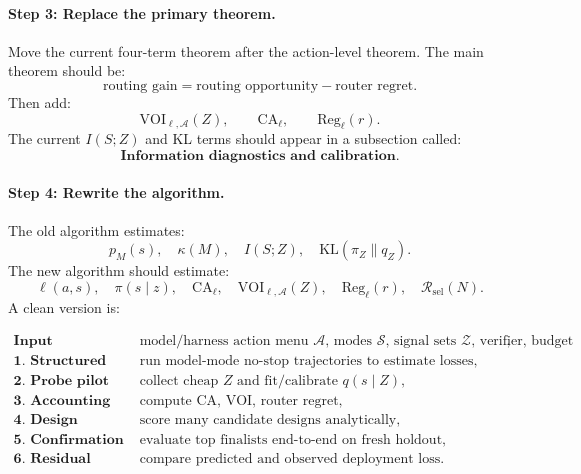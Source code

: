 \documentclass{article}
\newcommand{\KL}{\mathrm{KL}}
\begin{document}
\paragraph{Step 3: Replace the primary theorem.}
Move the current four-term theorem after the action-level theorem.
The main theorem should be:
\[
    \text{routing gain}=\text{routing opportunity}-\text{router regret}.
\]
Then add:
\[
    \mathrm{VOI}_{\ell,\mathcal A}(Z),
    \qquad
    \mathrm{CA}_\ell,
    \qquad
    \mathrm{Reg}_\ell(r).
\]
The current \(I(S;Z)\) and KL terms should appear in a subsection called:
\[
    \textbf{Information diagnostics and calibration.}
\]

\paragraph{Step 4: Rewrite the algorithm.}
The old algorithm estimates:
\[
    p_M(s),\quad \kappa(M),\quad I(S;Z),\quad \KL(\pi_Z\|q_Z).
\]
The new algorithm should estimate:
\[
    \ell(a,s),\quad
    \pi(s\mid z),\quad
    \mathrm{CA}_\ell,\quad
    \mathrm{VOI}_{\ell,\mathcal A}(Z),\quad
    \mathrm{Reg}_\ell(r),\quad
    \mathcal R_{\mathrm{sel}}(N).
\]
A clean version is:

\[
\begin{array}{ll}
    \textbf{Input} &
    \text{model/harness action menu \(\mathcal A\), modes \(\mathcal S\),
    signal sets \(\mathcal Z\), verifier, budget},\\
    \textbf{1. Structured pilot} &
    \text{run model-mode no-stop trajectories to estimate losses},\\
    \textbf{2. Probe pilot} &
    \text{collect cheap \(Z\) and fit/calibrate \(q(s\mid Z)\)},\\
    \textbf{3. Accounting} &
    \text{compute \(\mathrm{CA}\), \(\mathrm{VOI}\), router regret},\\
    \textbf{4. Design scoring} &
    \text{score many candidate designs analytically},\\
    \textbf{5. Confirmation} &
    \text{evaluate top finalists end-to-end on fresh holdout},\\
    \textbf{6. Residual audit} &
    \text{compare predicted and observed deployment loss}.
\end{array}
\]
\end{document}
